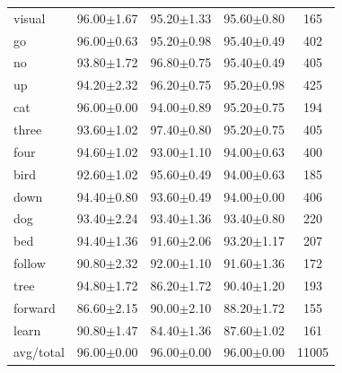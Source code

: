 \documentclass{beamer}
\begin{document}
{\begin{table}[h!]
\begin{tabular}{lcccc}
		visual    &  96.00$\pm$1.67 &  95.20$\pm$1.33 &  95.60$\pm$0.80 &     165 \\
		go        &  96.00$\pm$0.63 &  95.20$\pm$0.98 &  95.40$\pm$0.49 &     402 \\
		no        &  93.80$\pm$1.72 &  96.80$\pm$0.75 &  95.40$\pm$0.49 &     405 \\
		up        &  94.20$\pm$2.32 &  96.20$\pm$0.75 &  95.20$\pm$0.98 &     425 \\
		cat       &  96.00$\pm$0.00 &  94.00$\pm$0.89 &  95.20$\pm$0.75 &     194 \\
		three     &  93.60$\pm$1.02 &  97.40$\pm$0.80 &  95.20$\pm$0.75 &     405 \\
		four      &  94.60$\pm$1.02 &  93.00$\pm$1.10 &  94.00$\pm$0.63 &     400 \\
		bird      &  92.60$\pm$1.02 &  95.60$\pm$0.49 &  94.00$\pm$0.63 &     185 \\
		down      &  94.40$\pm$0.80 &  93.60$\pm$0.49 &  94.00$\pm$0.00 &     406 \\
		dog       &  93.40$\pm$2.24 &  93.40$\pm$1.36 &  93.40$\pm$0.80 &     220 \\
		bed       &  94.40$\pm$1.36 &  91.60$\pm$2.06 &  93.20$\pm$1.17 &     207 \\
		follow    &  90.80$\pm$2.32 &  92.00$\pm$1.10 &  91.60$\pm$1.36 &     172 \\
		tree      &  94.80$\pm$1.72 &  86.20$\pm$1.72 &  90.40$\pm$1.20 &     193 \\
		forward   &  86.60$\pm$2.15 &  90.00$\pm$2.10 &  88.20$\pm$1.72 &     155 \\
		learn     &  90.80$\pm$1.47 &  84.40$\pm$1.36 &  87.60$\pm$1.02 &     161 \\
		\midrule avg/total &  96.00$\pm$0.00 &  96.00$\pm$0.00 &  96.00$\pm$0.00 &   11005 \\
		\bottomrule
	\end{tabular}

\end{table}
}

\end{document}
